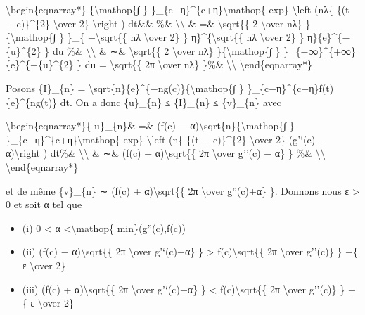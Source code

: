 \documentclass[]{article}
\begin{document}
\textbackslash{}begin\{eqnarray*\} \{\textbackslash{}mathop\{∫ \}
\}\_\{c−η\}\^{}\{c+η\}\textbackslash{}mathop\{ exp\}
\textbackslash{}left (nλ\{ \{(t − c)\}\^{}\{2\} \textbackslash{}over 2\}
\textbackslash{}right ) dt\&\& \%\& \textbackslash{}\textbackslash{} \&
=\& \textbackslash{}sqrt\{\{ 2 \textbackslash{}over
n\textbar{}λ\textbar{}\} \}\{\textbackslash{}mathop\{∫ \} \}\_\{
−\textbackslash{}sqrt\{\{ n\textbar{}λ\textbar{} \textbackslash{}over
2\} \} η\}\^{}\{\textbackslash{}sqrt\{\{ n\textbar{}λ\textbar{}
\textbackslash{}over 2\} \} η\}\{e\}\^{}\{−\{u\}\^{}\{2\} \} du \%\&
\textbackslash{}\textbackslash{} \& ∼\& \textbackslash{}sqrt\{\{ 2
\textbackslash{}over n\textbar{}λ\textbar{}\}
\}\{\textbackslash{}mathop\{∫ \}
\}\_\{−∞\}\^{}\{+∞\}\{e\}\^{}\{−\{u\}\^{}\{2\} \} du =
\textbackslash{}sqrt\{\{ 2π \textbackslash{}over
n\textbar{}λ\textbar{}\} \}\%\& \textbackslash{}\textbackslash{}
\textbackslash{}end\{eqnarray*\}

Posons \{I\}\_\{n\} =
\textbackslash{}sqrt\{n\}\{e\}\^{}\{−ng(c)\}\{\textbackslash{}mathop\{∫
\} \}\_\{c−η\}\^{}\{c+η\}f(t)\{e\}\^{}\{ng(t)\} dt. On a donc
\{u\}\_\{n\} ≤ \{I\}\_\{n\} ≤ \{v\}\_\{n\} avec

\textbackslash{}begin\{eqnarray*\}\{ u\}\_\{n\}\& =\& (f(c) −
α)\textbackslash{}sqrt\{n\}\{\textbackslash{}mathop\{∫ \}
\}\_\{c−η\}\^{}\{c+η\}\textbackslash{}mathop\{ exp\}
\textbackslash{}left (n\{ \{(t − c)\}\^{}\{2\} \textbackslash{}over 2\}
(g'`(c) − α)\textbackslash{}right ) dt\%\&
\textbackslash{}\textbackslash{} \& ∼\& (f(c) −
α)\textbackslash{}sqrt\{\{ 2π \textbackslash{}over \textbar{}g''(c) −
α\textbar{}\} \} \%\& \textbackslash{}\textbackslash{}
\textbackslash{}end\{eqnarray*\}

et de même \{v\}\_\{n\} ∼ (f(c) + α)\textbackslash{}sqrt\{\{ 2π
\textbackslash{}over \textbar{}g''(c)+α\textbar{}\} \}. Donnons nous ε
\textgreater{} 0 et soit α tel que

\begin{itemize}
\itemsep1pt\parskip0pt
\item
  (i) 0 \textless{} α \textless{}\textbackslash{}mathop\{
  min\}(\textbar{}g''(c)\textbar{},f(c))
\item
  (ii) (f(c) − α)\textbackslash{}sqrt\{\{ 2π \textbackslash{}over
  \textbar{}g'`(c)−α\textbar{}\} \} \textgreater{}
  f(c)\textbackslash{}sqrt\{\{ 2π \textbackslash{}over
  \textbar{}g''(c)\textbar{}\} \} −\{ ε \textbackslash{}over 2\}
\item
  (iii) (f(c) + α)\textbackslash{}sqrt\{\{ 2π \textbackslash{}over
  \textbar{}g'`(c)+α\textbar{}\} \} \textless{}
  f(c)\textbackslash{}sqrt\{\{ 2π \textbackslash{}over
  \textbar{}g''(c)\textbar{}\} \} +\{ ε \textbackslash{}over 2\}
\end{itemize}
\end{document}
